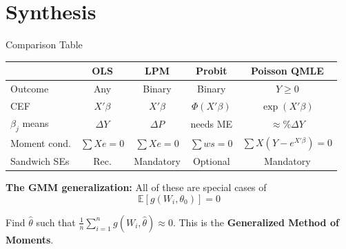 \documentclass[aspectratio=169]{beamer}
\numberwithin{equation}{section}
\begin{document}
\section{Synthesis}

\begin{frame}{Comparison Table}

\begin{center}
\renewcommand{\arraystretch}{1.4}
\begin{tabular}{lcccc}
\toprule
& \textbf{OLS} & \textbf{LPM} & \textbf{Probit} & \textbf{Poisson QMLE} \\
\midrule
Outcome & Any & Binary & Binary & $Y \geq 0$ \\
CEF & $X'\beta$ & $X'\beta$ & $\Phi(X'\beta)$ & $\exp(X'\beta)$ \\
$\beta_j$ means & $\Delta Y$ & $\Delta P$ & needs ME & $\approx \%\Delta Y$ \\
Moment cond. & $\sum Xe = 0$ & $\sum Xe = 0$ & $\sum ws = 0$ & $\sum X(Y-e^{X'\beta})=0$ \\
Sandwich SEs & Rec. & Mandatory & Optional & \alert{Mandatory} \\
\bottomrule
\end{tabular}
\renewcommand{\arraystretch}{1.0}
\end{center}

\pause

\textbf{The GMM generalization:} All of these are special cases of
\[
\mathbb{E}[g(W_i, \theta_0)] = 0
\]

Find $\hat\theta$ such that $\frac{1}{n}\sum_{i=1}^n g(W_i, \hat\theta) \approx 0$. This is the \textbf{Generalized Method of Moments}.

\end{frame}

\end{document}
